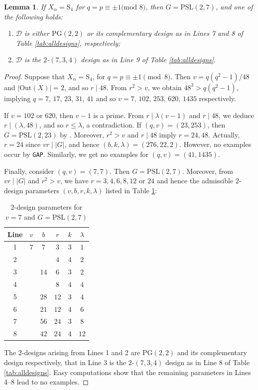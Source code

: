 \documentclass[a4paper,twopage,reqno,12pt]{amsart}
\newtheorem{lemma}[theorem]{Lemma}
\theoremstyle{definition}
\numberwithin{equation}{section}
\newcommand{\PSL}{\mathrm{PSL}}
\renewcommand{\S}{\mathrm{S}}
\newcommand{\Out}{\mathrm{Out}}
\newcommand{\PG}{\mathrm{PG}}
\begin{document}
\begin{lemma}\label{case5}
If $X_\alpha = \S_4$ for $q=p\equiv \pm 1\text{(mod 8)}$, then 
$G = \PSL(2,7)$, and one of the following holds:
\begin{enumerate}
    \item $\mathcal D$ is either $\PG(2,2)$ or its complementary design as in Lines 7 and 8 of Table \ref{tab:alldesigns}, respectively;
    \item $\mathcal D$ is the $2$-$(7,3,4)$ design as in Line 9 of Table \ref{tab:alldesigns}.
 \end{enumerate}
\end{lemma}

\begin{proof}
Suppose that $X_{\alpha}=\S_4$, for $q=p\equiv \pm 1 \pmod{8}$.
Then $v=q(q^2-1)/48$ and $\left\vert\Out(X)\right\vert=2$, and so $r\mid 48$.
From $r^2> v$, we obtain $48^3>q(q^2-1)$, %
implying $q=7$, $17$, $23$, $31$, $41$ and so $v=7$, $102$, $253$, $620$, $1435$ respectively. 

If $v=102$ or $620$, then $v-1$ is a prime.
From $r\mid \lambda(v-1)$ and $r\mid 48$,
we deduce $r\mid (\lambda, 48)$,  and so $r\le \lambda$, a contradiction.
If $(q,v)=(23,253)$, then $G=\PSL(2,23)$ by \cite{At}. Moreover, $r^2>v$ and $r\mid 48$ imply $r=24,48$. Actually, $r=24$ since $vr\mid \left\vert G\right\vert $, and hence $(b,k,\lambda)=(276,22,2)$. However, no examples occur by \texttt{GAP}. Similarly, we get no examples for $(q,v)=(41,1435)$.

Finally, consider $(q,v)=(7,7)$. Then $G=\PSL(2,7)$. Moreover, from $vr\mid \left \vert G \right\vert $ and $r^2>v$, we have $r=3,4,6,8,12$ or $24$ and hence the admissible $2$-design parameters $(v,b,r,k,\lambda)$ 
listed in Table \ref{tab:S4}:
\begin{table}[H]
\tiny
\centering 
\caption{$2$-design parameters for $v=7$ and $G=\PSL(2,7)$} 
\label{tab:S4} 
\begin{tabular}{cccccc}
\toprule
Line &  $v$ & $b$ & $r$ & $k$ & $\lambda$ \\ 
\midrule
1 &  $7$ & $7$ & $3$ & $3$ & $1$\\
2 &    &      & $4$ & $4$ & $2$\\
3 &    & $14$ & $6$ & $3$ & $2$\\
4 &   &       & $8$ & $4$ & $4$  \\
5 &  & $28$ & $12$ & $3$ & $4$   \\
6 &  & $21$ & $12$ & $4$ & $6$  \\  
7 &  & $56$ & $24$ & $3$ & $8$  \\ 
8 &  & $42$ & $24$ & $4$ & $12$  \\
\bottomrule
\end{tabular}
\end{table}
The $2$-designs arising from Lines 1 and 2 are $\PG(2,2)$ and its complementary design respectively, that in Line 3 is the $2$-$(7,3,4)$ design as in Line 8 of Table \ref{tab:alldesigns}. Easy computations show that the remaining parameters in Lines 4--8 lead to no examples.
\end{proof}
\end{document}
